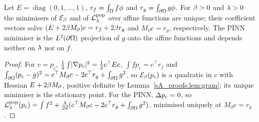 \begin{proposition}\label{sA_proofs:prop:presolve}
Let $E=\operatorname{diag}(0,1,\dots,1)$, $r_f=\int_\Omega f\phi$ and $r_g=\int_{\partial\Omega}g\phi$. For $\beta>0$
and $\lambda>0$ the minimisers of $\mathcal{E}_{\beta}$ and of $\mathcal{L}^{\mathrm{pop}}_\lambda$ over affine functions are unique; their
coefficient vectors solve $(E+2\beta M_\partial)c=r_f+2\beta r_g$ and $M_\partial c=r_g$, respectively. The PINN
minimiser is the $L^2(\partial\Omega)$ projection of $g$ onto the affine functions and depends neither on
$\lambda$ nor on $f$.
\end{proposition}
\begin{proof}
For $v=p_c$, $\frac12\int\lvert \nabla p_c\rvert^2=\frac12c^\top Ec$, $\int fp_c=c^\top r_f$ and
$\int_{\partial\Omega}(p_c-g)^2=c^\top M_\partial c-2c^\top r_g+\int_{\partial\Omega}g^2$, so $\mathcal{E}_{\beta}(p_c)$ is a quadratic in $c$
with Hessian $E+2\beta M_\partial$, positive definite by Lemma~\ref{sA_proofs:lem:gram}; its unique minimiser
is the stationary point. For the PINN, $\Delta p_c=0$, so
$\mathcal{L}^{\mathrm{pop}}_\lambda(p_c)=\int f^2+\frac{\lambda}{2d}(c^\top M_\partial c-2c^\top r_g+\int_{\partial\Omega}g^2)$, minimised uniquely at
$M_\partial c=r_g$.
\end{proof}

